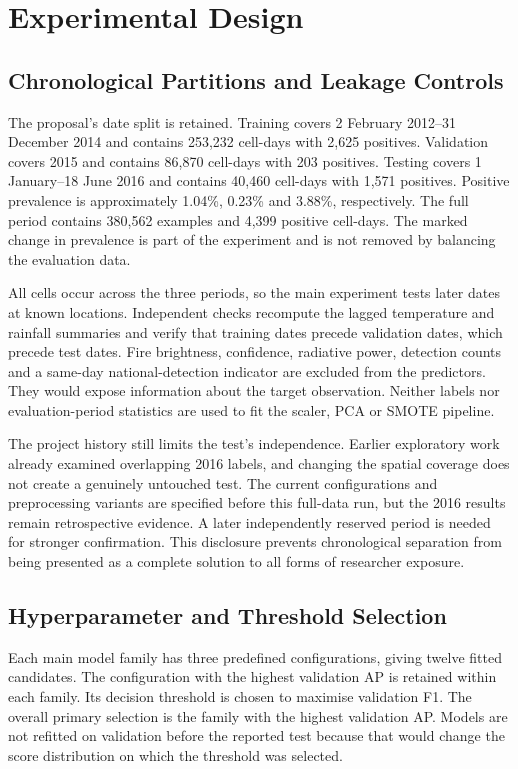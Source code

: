 \documentclass[conference,a4paper]{IEEEtran}
\begin{document}
\section{Experimental Design}
\subsection{Chronological Partitions and Leakage Controls}
The proposal's date split is retained. Training covers 2 February 2012--31 December 2014 and contains 253,232 cell-days with 2,625 positives. Validation covers 2015 and contains 86,870 cell-days with 203 positives. Testing covers 1 January--18 June 2016 and contains 40,460 cell-days with 1,571 positives. Positive prevalence is approximately 1.04\%, 0.23\% and 3.88\%, respectively. The full period contains 380,562 examples and 4,399 positive cell-days. The marked change in prevalence is part of the experiment and is not removed by balancing the evaluation data.

All cells occur across the three periods, so the main experiment tests later dates at known locations. Independent checks recompute the lagged temperature and rainfall summaries and verify that training dates precede validation dates, which precede test dates. Fire brightness, confidence, radiative power, detection counts and a same-day national-detection indicator are excluded from the predictors. They would expose information about the target observation. Neither labels nor evaluation-period statistics are used to fit the scaler, PCA or SMOTE pipeline.

The project history still limits the test's independence. Earlier exploratory work already examined overlapping 2016 labels, and changing the spatial coverage does not create a genuinely untouched test. The current configurations and preprocessing variants are specified before this full-data run, but the 2016 results remain retrospective evidence. A later independently reserved period is needed for stronger confirmation. This disclosure prevents chronological separation from being presented as a complete solution to all forms of researcher exposure.

\subsection{Hyperparameter and Threshold Selection}
Each main model family has three predefined configurations, giving twelve fitted candidates. The configuration with the highest validation AP is retained within each family. Its decision threshold is chosen to maximise validation F1. The overall primary selection is the family with the highest validation AP. Models are not refitted on validation before the reported test because that would change the score distribution on which the threshold was selected.
\end{document}
